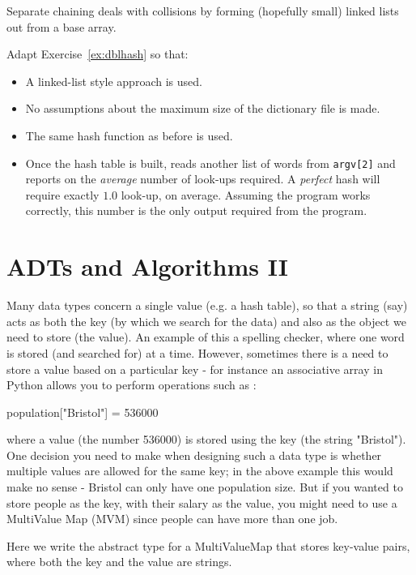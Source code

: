 Separate chaining deals with collisions by forming (hopefully small) linked lists
out from a base array.
\begin{exercise}
Adapt Exercise~\ref{ex:dblhash} so that:
\begin{itemize}
\item A linked-list style approach is used.
\item No assumptions about the maximum size of the dictionary file is made.
\item The same hash function as before is used.
\item Once the hash table is built, reads another list of words from \verb^argv[2]^
and reports on the {\em average} number of  look-ups required. A {\em perfect} hash
will require exactly $1.0$ look-up, on average. Assuming the program works correctly,
this number is the only output required from the program.
\end{itemize}
\end{exercise}

\chapter{ADTs and Algorithms II}




Many data types concern a single value (e.g. a hash table), so that
a string (say) acts as both the key (by which we search for the data)
and also as the object we need to store (the value). An example of this a spelling checker,
where one word is stored (and searched for) at a time.  However, sometimes
there is a need to store a value based on a particular key - for instance
an associative array in Python allows you to perform operations such as :
\begin{codesnippet} 
population["Bristol"] = 536000
\end{codesnippet} 
where a value (the number 536000) is stored using the key (the string "Bristol").
One decision you need to make when designing such a data type is whether
multiple values are allowed for the same key; in the above example this
would make no sense - Bristol can only have one population size. But if
you wanted to store people as the key, with their salary as the value,
you might need to use a MultiValue Map (MVM) since people can have more than
one job.

Here we write the abstract type for a MultiValueMap that stores key-value pairs,
where both the key and the value are strings.

